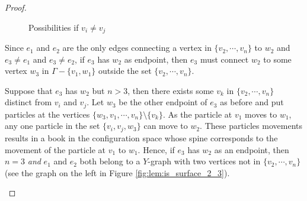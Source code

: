 \begin{proof}
\begin{figure}[h!]
        \quad\quad
        \caption{Possibilities if \(v_i \neq v_j\)}
        \label{fig:lem:is_surface_2_2}
    \end{figure}

    Since \(e_1\) and \(e_2\) are the only edges connecting a vertex in \(\{v_2, \cdots, v_n\}\) to \(w_2\) and \(e_3 \neq e_1\) and \(e_3 \neq e_2\),
    if \(e_3\) has \(w_2\) as endpoint, then \(e_3\) must connect \(w_2\) to some vertex \(w_3\) in \(\Gamma - \{v_1, w_1\}\) outside the set \(\{v_2, \cdots, v_n\}\).

    Suppose that \(e_3\) has \(w_2\) but \(n > 3\),
    then there exists some \(v_k\) in \(\{v_2, \cdots, v_n\}\) distinct from \(v_i\) and \(v_j\). 
    Let \(w_3\) be the other endpoint of \(e_3\) as before and put particles at the vertices \(\{w_3, v_1, \cdots, v_n\}\setminus\{v_k\}\). 
    As the particle at \(v_1\) moves to \(w_1\),
    any one particle in the set \(\{v_i, v_j, w_3\}\) can move to \(w_2\). 
    These particles movements results in a book in the configuration space whose spine corresponds to the movement of the particle at \(v_1\) to \(w_1\). 
    Hence, if \(e_3\) has \(w_2\) as an endpoint, 
    then \(n=3\) \textit{and} \(e_1\) and \(e_2\) both belong to a \(Y\)-graph with two vertices not in \(\{v_2, \cdots, v_n\}\)
    (see the graph on the left in Figure \ref{fig:lem:is_surface_2_3}).

    \begin{figure}[h!]
        \centering
\end{figure}
\end{proof}
